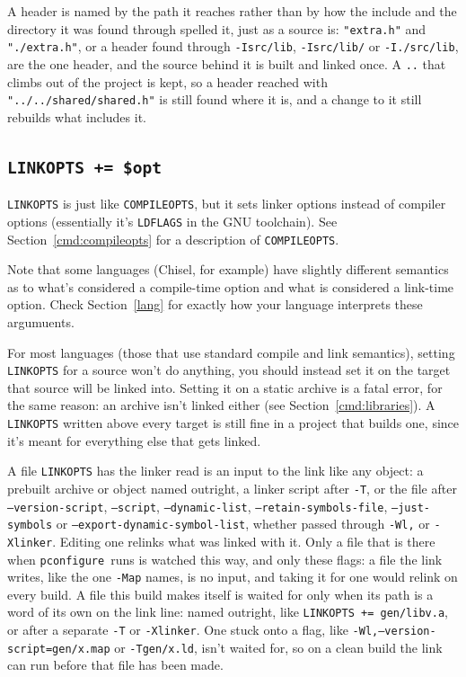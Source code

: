 \documentclass{article}
\newcommand{\pconfigure}{\texttt{pconfigure}}
\begin{document}
A header is named by the path it reaches rather than by how the
include and the directory it was found through spelled it, just as a
source is: \texttt{"extra.h"} and \texttt{"./extra.h"}, or a header
found through \texttt{-Isrc/lib}, \texttt{-Isrc/lib/} or
\texttt{-I./src/lib}, are the one header, and the source behind it is
built and linked once.  A \texttt{..} that climbs out of the project
is kept, so a header reached with \texttt{"../../shared/shared.h"}
is still found where it is, and a change to it still rebuilds what
includes it.

\subsection{\texttt{LINKOPTS += \$opt}}

\texttt{LINKOPTS} is just like \texttt{COMPILEOPTS}, but it sets
linker options instead of compiler options (essentially it's
\texttt{LDFLAGS} in the GNU toolchain).  See
Section~\ref{cmd:compileopts} for a description of
\texttt{COMPILEOPTS}.

Note that some languages (Chisel, for example) have slightly different
semantics as to what's considered a compile-time option and what is
considered a link-time option.  Check Section~\ref{lang} for exactly
how your language interprets these argumuents.

For most languages (those that use standard compile and link
semantics), setting \texttt{LINKOPTS} for a source won't do anything,
you should instead set it on the target that source will be linked
into.  Setting it on a static archive is a fatal error, for the same
reason: an archive isn't linked either (see
Section~\ref{cmd:libraries}).  A \texttt{LINKOPTS} written above every
target is still fine in a project that builds one, since it's meant
for everything else that gets linked.

A file \texttt{LINKOPTS} has the linker read is an input to the link
like any object: a prebuilt archive or object named outright, a linker
script after \texttt{-T}, or the file after \texttt{--version-script},
\texttt{--script}, \texttt{--dynamic-list},
\texttt{--retain-symbols-file}, \texttt{--just-symbols} or
\texttt{--export-dynamic-symbol-list}, whether passed through
\texttt{-Wl,} or \texttt{-Xlinker}.  Editing one relinks what was
linked with it.  Only a file that is there when \pconfigure\ runs is
watched this way, and only these flags: a file the link writes, like
the one \texttt{-Map} names, is no input, and taking it for one would
relink on every build.  A file this build makes itself is waited for
only when its path is a word of its own on the link line: named
outright, like \texttt{LINKOPTS += gen/libv.a}, or after a separate
\texttt{-T} or \texttt{-Xlinker}.  One stuck onto a flag, like
\texttt{-Wl,--version-script=gen/x.map} or \texttt{-Tgen/x.ld}, isn't
waited for, so on a clean build the link can run before that file has
been made.
\end{document}
